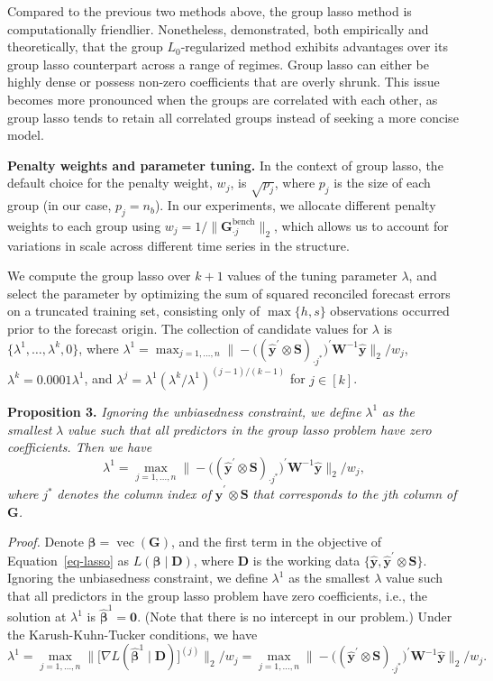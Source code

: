 \documentclass[
  11pt]{article}
\begin{document}
Compared to the previous two methods above, the group lasso method is
computationally friendlier. Nonetheless, \citet{Hazimeh2023-ie}
demonstrated, both empirically and theoretically, that the group
\(L_0\)-regularized method exhibits advantages over its group lasso
counterpart across a range of regimes. Group lasso can either be highly
dense or possess non-zero coefficients that are overly shrunk. This
issue becomes more pronounced when the groups are correlated with each
other, as group lasso tends to retain all correlated groups instead of
seeking a more concise model.

\textbf{Penalty weights and parameter tuning.} In the context of group
lasso, the default choice for the penalty weight, \(w_j\), is
\(\sqrt{p_j}\), where \(p_j\) is the size of each group (in our case,
\(p_j = n_b\)). In our experiments, we allocate different penalty
weights to each group using
\(w_j = 1/\|\bm{G}_{\cdot j}^{\text{bench}}\|_2\), which allows us to
account for variations in scale across different time series in the
structure.

We compute the group lasso over \(k+1\) values of the tuning parameter
\(\lambda\), and select the parameter by optimizing the sum of squared
reconciled forecast errors on a truncated training set, consisting only
of \(\max\{h, s\}\) observations occurred prior to the forecast origin.
The collection of candidate values for \(\lambda\) is
\(\{\lambda^{1},\dots,\lambda^{k}, 0\}\), where
\(\lambda^{1} = \max_{j=1, \ldots, n}\big\|-\big((\hat{\bm{y}}^{\prime} \otimes \bm{S})_{\cdot j^{*}}\big)^{\prime} \bm{W}^{-1} \hat{\bm{y}}\big\|_2 / w_j\),
\(\lambda^{k} = 0.0001\lambda^{1}\), and
\(\lambda^{j} = \lambda^{1}(\lambda^{k} / \lambda^{1})^{(j-1) / (k-1)}\)
for \(j \in [k]\).

\textbf{Proposition 3.} \emph{Ignoring the unbiasedness constraint, we
define} \(\lambda^{1}\) \emph{as the smallest} \(\lambda\) \emph{value
such that all predictors in the group lasso problem have zero
coefficients. Then we have} \[
\lambda^{1} = \max_{j=1, \ldots, n}\big\|-\big((\hat{\bm{y}}^{\prime} \otimes \bm{S})_{\cdot j^{*}}\big)^{\prime} \bm{W}^{-1} \hat{\bm{y}}\big\|_2 / w_j,
\] \emph{where} \(j^{*}\) \emph{denotes the column index of}
\(\hat{\bm{y}}^{\prime} \otimes \bm{S}\) \emph{that corresponds to the}
\(j\)\emph{th column of} \(\bm{G}\)\emph{.}

\emph{Proof.} Denote \(\bm{\beta} = \operatorname{vec}(\bm{G})\), and
the first term in the objective of Equation~\ref{eq-lasso} as
\(L\left(\bm{\beta} \mid \bm{D}\right)\), where \(\bm{D}\) is the
working data
\(\{\hat{\bm{y}} , \hat{\bm{y}}^{\prime} \otimes \bm{S}\}\). Ignoring
the unbiasedness constraint, we define \(\lambda^{1}\) as the smallest
\(\lambda\) value such that all predictors in the group lasso problem
have zero coefficients, i.e., the solution at \(\lambda^{1}\) is
\(\hat{\bm{\beta}}^{1}=\bm{0}\). (Note that there is no intercept in our
problem.) Under the Karush-Kuhn-Tucker conditions, we have \[
\lambda^{1}
 = \max_{j=1, \ldots, n}\big\|\big[\nabla L(\hat{\bm{\beta}}^{1} \mid \bm{D})\big]^{(j)}\big\|_2 / w_j
 = \max_{j=1, \ldots, n}\big\|-\big((\hat{\bm{y}}^{\prime} \otimes \bm{S})_{\cdot j^{*}}\big)^{\prime} \bm{W}^{-1} \hat{\bm{y}}\big\|_2 / w_j.
\]
\end{document}
